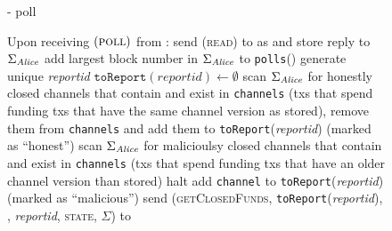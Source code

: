   \begin{figure}[H]
    \begin{systembox}{\fpaynet - poll}
      \begin{algorithmic}[1]
        \State Upon receiving $\left(\textsc{poll}\right)$ from \alice:
        \Indent
          \State send (\textsc{read}) to \ledger{} as \alice{} and store reply
          to $\Sigma_{\mathit{Alice}}$
          \State add largest block number in $\Sigma_{\mathit{Alice}}$ to
          \texttt{polls}(\alice)
          \State generate unique \textit{reportid}
          \State $\mathtt{toReport}\left(\mathit{reportid}\right) \gets
          \emptyset$
          \State scan $\Sigma_{\mathit{Alice}}$ for honestly closed channels that
          contain \alice{} and exist in \texttt{channels} (txs that spend
          funding txs that have the same channel version as stored), remove them
          from \texttt{channels} and add them to
          \texttt{toReport}(\textit{reportid}) (marked as ``honest'')
          \State scan $\Sigma_{\mathit{Alice}}$ for malicioulsy closed channels that
          contain \alice{} and exist in \texttt{channels} (txs that spend
          funding txs that have an older channel version than stored)
              \State halt 
            \EndIf
            \State add \texttt{channel} to \texttt{toReport}(\textit{reportid})
            (marked as ``malicious'')
          \EndFor
          \State send (\textsc{getClosedFunds},
          \texttt{toReport}(\textit{reportid}), \alice, \textit{reportid},
          \textsc{state}, $\Sigma$) to \simulator
        \EndIndent
        \Statex


\end{algorithmic}
\end{systembox}
\end{figure}
